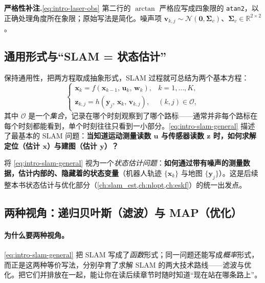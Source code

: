\begin{note}
\textbf{严格性补注.}\;\cref{eq:intro-laser-obs} 第二行的 $\arctan$ 严格应写成四象限的 \texttt{atan2}，以正确处理角度所在象限；原始写法是简化。噪声项 $\mathbf{v}_{k,j}\sim\mathcal{N}(\mathbf{0},\boldsymbol{\Sigma}_v)$、$\boldsymbol{\Sigma}_v\in\mathbb{R}^{2\times2}$。
\end{note}

\subsection{通用形式与“SLAM = 状态估计”}
\label{sec:intro-statevar}
保持通用性，把两方程取成抽象形式，SLAM 过程就可总结为两个基本方程\cite{gaoxiang2019slam14}：
\begin{equation}
  \left\{
  \begin{array}{ll}
    \mathbf{x}_k = f\!\left(\mathbf{x}_{k-1},\,\mathbf{u}_k,\,\mathbf{w}_k\right), & k=1,\dots,K,\\[4pt]
    \mathbf{z}_{k,j} = h\!\left(\mathbf{y}_j,\,\mathbf{x}_k,\,\mathbf{v}_{k,j}\right), & (k,j)\in\mathcal{O},
  \end{array}
  \right.
  \label{eq:intro-slam-general}
\end{equation}
其中 $\mathcal{O}$ 是一个\emph{集合}，记录在哪个时刻观察到了哪个路标——通常并非每个路标在每个时刻都能看到，单个时刻往往只看到一小部分。\cref{eq:intro-slam-general} 描述了最基本的 SLAM 问题：\textbf{当知道运动测量读数 $\mathbf{u}$ 与传感器读数 $\mathbf{z}$ 时，如何求解定位（估计 $\mathbf{x}$）与建图（估计 $\mathbf{y}$）？}

\begin{definition}\label{def:intro-state-est}
将 \cref{eq:intro-slam-general} 视为一个\emph{状态估计问题}：\textbf{如何通过带有噪声的测量数据，估计内部的、隐藏着的状态变量}（机器人轨迹 $\{\mathbf{x}_k\}$ 与地图 $\{\mathbf{y}_j\}$）\cite{gaoxiang2019slam14}。这是后续整本书状态估计与优化部分（\cref{ch:slam_est,ch:nlopt,ch:eskf}）的统一出发点。
\end{definition}

\subsection{两种视角：递归贝叶斯（滤波）与 MAP（优化）}
\label{sec:intro-two-views}
\paragraph{为什么要两种视角。}
\cref{eq:intro-slam-general} 把 SLAM 写成了\emph{函数}形式；同一问题还能写成\emph{概率}形式，而正是这两种等价写法，分别孕育了求解 SLAM 的两大技术路线——滤波与优化。把它们并排放在一起，能让你在读后续章节时随时知道“现在站在哪条路上”。

